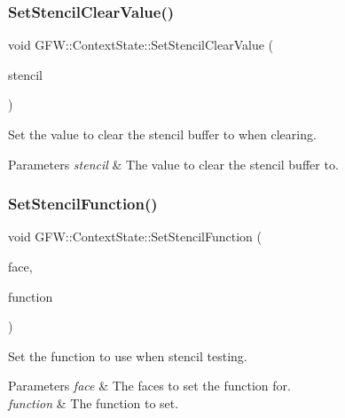 \subsubsection{\texorpdfstring{Set\+Stencil\+Clear\+Value()}{SetStencilClearValue()}}
{\footnotesize\ttfamily void G\+F\+W\+::\+Context\+State\+::\+Set\+Stencil\+Clear\+Value (\begin{DoxyParamCaption}\item[{int}]{stencil }\end{DoxyParamCaption})}



Set the value to clear the stencil buffer to when clearing. 


\begin{DoxyParams}{Parameters}
{\em stencil} & The value to clear the stencil buffer to. \\
\hline
\end{DoxyParams}
\mbox{\label{class_g_f_w_1_1_context_state_ad898aef17c3c1e30cfaa5290a965ce7a}} 
\subsubsection{\texorpdfstring{Set\+Stencil\+Function()}{SetStencilFunction()}}
{\footnotesize\ttfamily void G\+F\+W\+::\+Context\+State\+::\+Set\+Stencil\+Function (\begin{DoxyParamCaption}\item[{\hyperlink{namespace_g_f_w_a393ef12f1927ff3e7b73b11f72d551eb}{Face\+Direction}}]{face,  }\item[{\hyperlink{namespace_g_f_w_a2eabb5a646179bceaab2d5e3bfce2316}{Test\+Function}}]{function }\end{DoxyParamCaption})}



Set the function to use when stencil testing. 


\begin{DoxyParams}{Parameters}
{\em face} & The faces to set the function for. \\
\hline
{\em function} & The function to set. \\
\hline
\end{DoxyParams}
\mbox{\label{class_g_f_w_1_1_context_state_a110e8f561931a8ce5c37feb3d7f53c89}} 
